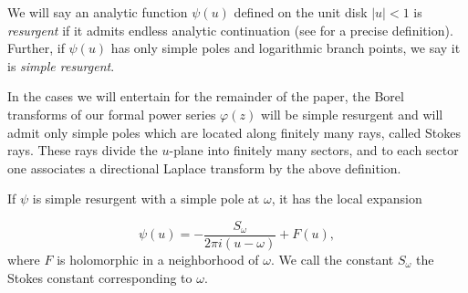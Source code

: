 \documentclass[12pt]{amsart}
\theoremstyle{definition}
\theoremstyle{plain}
\newtheorem{definition}[theorem]{Definition}
\numberwithin{equation}{section}
\begin{document}
 We will say an analytic function $\psi(u)$ defined on the unit disk $|u| < 1$ is \textit{resurgent} if it admits endless analytic continuation (see \cite{ecalle} for a precise definition). 
	 Further, if $\psi(u)$ has only simple poles and logarithmic branch points, we say it is \textit{simple resurgent}. 

In the cases we will entertain for the remainder of the paper, the Borel transforms of our formal power series $\varphi(z)$ will be simple resurgent and will admit only simple poles which are located along finitely many rays, called Stokes rays. These rays divide the $u$-plane into finitely many sectors, and to each sector one associates a directional Laplace transform by the above definition. 

If $\psi$ is simple resurgent with a simple pole at $\omega$, it has the local expansion

\[\psi(u) = -\frac{S_\omega}{2\pi i(u-\omega)} + F(u),
\]
where $F$ is holomorphic in a neighborhood of $\omega$. We call the constant $S_\omega$ the Stokes constant corresponding to $\omega$. 
\end{document}
